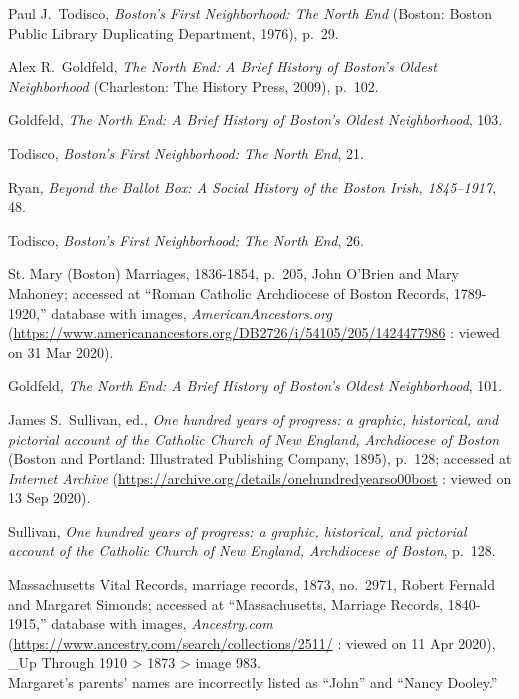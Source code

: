 \begin{thebibliography}{999}
Paul J.\ Todisco, \textit{Boston's First Neighborhood: The North End} (Boston: Boston Public Library Duplicating Department, 1976), p.\ 29.

Alex R.\ Goldfeld, \textit{The North End: A Brief History of Boston's Oldest Neighborhood} (Charleston: The History Press, 2009), p.\ 102.

Goldfeld, \textit{The North End: A Brief History of Boston's Oldest Neighborhood}, 103.

Todisco, \textit{Boston's First Neighborhood: The North End}, 21.

Ryan, \textit{Beyond the Ballot Box: A Social History of the Boston Irish, 1845--1917}, 48.

Todisco, \textit{Boston's First Neighborhood: The North End}, 26.

St. Mary (Boston) Marriages, 1836-1854, p.\ 205, John O'Brien and Mary Mahoney; accessed at ``Roman Catholic Archdiocese of Boston Records, 1789-1920,'' database with images, \textit{AmericanAncestors.org} (\url{https://www.americanancestors.org/DB2726/i/54105/205/1424477986} : viewed on 31 Mar 2020).

Goldfeld, \textit{The North End: A Brief History of Boston's Oldest Neighborhood}, 101.

James S.\ Sullivan, ed., \textit{One hundred years of progress: a graphic, historical, and pictorial account of the Catholic Church of New England, Archdiocese of Boston} (Boston and Portland: Illustrated Publishing Company, 1895), p.\ 128; accessed at \textit{Internet Archive} (\url{https://archive.org/details/onehundredyearso00bost} : viewed on 13 Sep 2020).

Sullivan, \textit{One hundred years of progress: a graphic, historical, and pictorial account of the Catholic Church of New England, Archdiocese of Boston}, p.\ 128.

Massachusetts Vital Records, marriage records, 1873, no.\ 2971, Robert Fernald and Margaret Simonds; accessed at ``Massachusetts, Marriage Records, 1840-1915,'' database with images, \textit{Ancestry.com} (\url{https://www.ancestry.com/search/collections/2511/} : viewed on 11 Apr 2020), \_Up Through 1910 > 1873 > image 983.\\
Margaret's parents' names are incorrectly listed as ``John'' and ``Nancy Dooley.''


\end{thebibliography}
